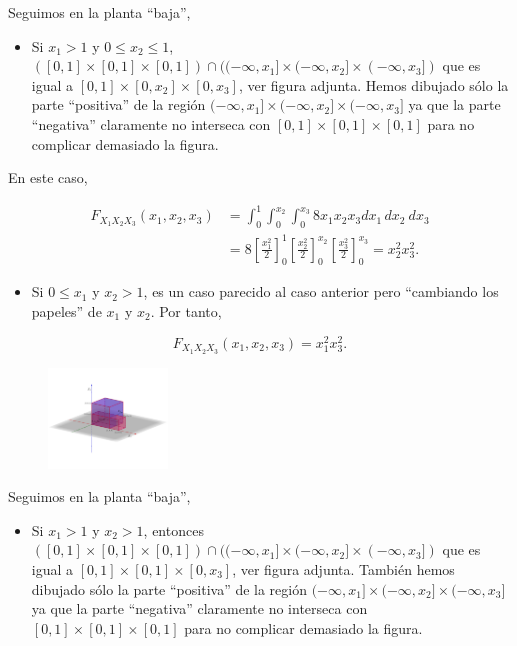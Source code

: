 \documentclass[]{book}
\providecommand{\tightlist}{%
  \setlength{\itemsep}{0pt}\setlength{\parskip}{0pt}}
\begin{document}
Seguimos en la planta ``baja'',

\begin{itemize}
\tightlist
\item
  Si \(x_1 >1\) y \(0\leq x_2\leq 1\), \(([0,1]\times [0,1]\times [0,1])\cap ((-\infty,x_1]\times (-\infty,x_2]\times (-\infty,x_3])\) que es igual a \([0,1]\times [0,x_2]\times [0,x_3]\), ver figura adjunta. Hemos dibujado sólo la parte ``positiva'' de la región \((-\infty,x_1]\times (-\infty,x_2]\times (-\infty,x_3]\) ya que la parte ``negativa'' claramente no interseca con \([0,1]\times [0,1]\times [0,1]\) para no complicar demasiado la figura.
\end{itemize}

En este caso,

\[
\begin{array}{rl}
F_{X_1X_2X_3}(x_1,x_2,x_3) & =\int_{0}^{1}\int_{0}^{x_2}\int_{0}^{x_3} 8 x_1 x_2 x_3 dx_1\, dx_2\ dx_3 \\
& = 
8\left[\frac{x_1^2}{2}\right]_0^{1}\left[\frac{x_2^2}{2}\right]_0^{x_2}\left[\frac{x_3^2}{2}\right]_0^{x_3} = x_2^2 x_3^2.
\end{array}
\]

\begin{itemize}
\tightlist
\item
  Si \(0\leq x_1\) y \(x_2>1\), es un caso parecido al caso anterior pero ``cambiando los papeles'' de \(x_1\) y \(x_2\).
  Por tanto,
\end{itemize}

\[
F_{X_1X_2X_3}(x_1,x_2,x_3)=x_1^2 x_3^2.
\]

\begin{figure}

{\centering \includegraphics[width=1.25in]{Images/Fx1x2x3bajosx1} 

}

\end{figure}

Seguimos en la planta ``baja'',

\begin{itemize}
\tightlist
\item
  Si \(x_1>1\) y \(x_2>1\), entonces \(([0,1]\times [0,1]\times [0,1])\cap ((-\infty,x_1]\times (-\infty,x_2]\times (-\infty,x_3])\) que es igual a \([0,1]\times [0,1]\times [0,x_3]\), ver figura adjunta. También hemos dibujado sólo la parte ``positiva'' de la región \((-\infty,x_1]\times (-\infty,x_2]\times (-\infty,x_3]\) ya que la parte ``negativa'' claramente no interseca con \([0,1]\times [0,1]\times [0,1]\) para no complicar demasiado la figura.
\end{itemize}
\end{document}
